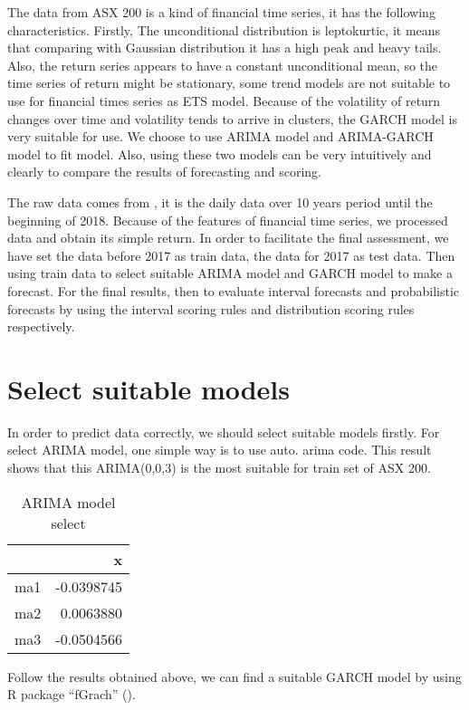 \documentclass{monashthesis}
\theoremstyle{definition}
\theoremstyle{definition}
\theoremstyle{definition}
\theoremstyle{remark}
\begin{document}
The data from ASX 200 is a kind of financial time series, it has the
following characteristics. Firstly, The unconditional distribution is
leptokurtic, it means that comparing with Gaussian distribution it has a
high peak and heavy tails. Also, the return series appears to have a
constant unconditional mean, so the time series of return might be
stationary, some trend models are not suitable to use for financial
times series as ETS model. Because of the volatility of return changes
over time and volatility tends to arrive in clusters, the GARCH model is
very suitable for use. We choose to use ARIMA model and ARIMA-GARCH
model to fit model. Also, using these two models can be very intuitively
and clearly to compare the results of forecasting and scoring.

The raw data comes from \textcite{YH}, it is the daily data over 10
years period until the beginning of 2018. Because of the features of
financial time series, we processed data and obtain its simple return.
In order to facilitate the final assessment, we have set the data before
2017 as train data, the data for 2017 as test data. Then using train
data to select suitable ARIMA model and GARCH model to make a forecast.
For the final results, then to evaluate interval forecasts and
probabilistic forecasts by using the interval scoring rules and
distribution scoring rules respectively.

\section{Select suitable models}\label{select-suitable-models}

In order to predict data correctly, we should select suitable models
firstly. For select ARIMA model, one simple way is to use auto. arima
code. This result shows that this ARIMA(0,0,3) is the most suitable for
train set of ASX 200.

\begin{table}

\caption{\label{tab:modelselect1}ARIMA model select}
\centering
\begin{tabular}[t]{lr}
\toprule
  & x\\
\midrule
ma1 & -0.0398745\\
ma2 & 0.0063880\\
ma3 & -0.0504566\\
\bottomrule
\end{tabular}
\end{table}

Follow the results obtained above, we can find a suitable GARCH model by
using R package ``fGrach'' (\textcite{WD17}).
\end{document}
